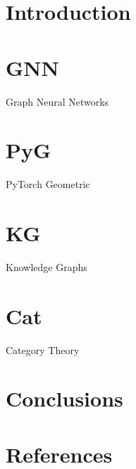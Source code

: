 \section[Intro]{Introduction}


\section{GNN}{Graph Neural Networks}


\section{PyG}{PyTorch Geometric}


\section{KG}{Knowledge Graphs}


\section{Cat}{Category Theory}



\section[Conclusions]{Conclusions}


\section[Refs]{References}
